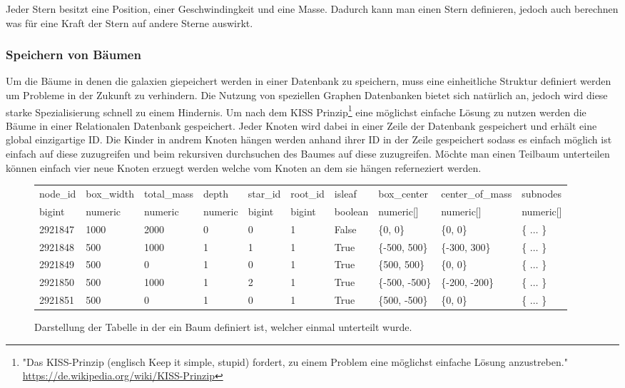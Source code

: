 \par Jeder Stern besitzt eine Position, einer Geschwindingkeit und eine Masse.
Dadurch kann man einen Stern definieren, jedoch auch berechnen was für eine
Kraft der Stern auf andere Sterne auswirkt. 

\subsubsection{Speichern von Bäumen}
Um die Bäume in denen die galaxien giepeichert werden in einer Datenbank zu
speichern, muss eine einheitliche Struktur definiert werden um Probleme in der
Zukunft zu verhindern. Die Nutzung von speziellen Graphen Datenbanken bietet
sich natürlich an, jedoch wird diese starke Spezialisierung schnell zu einem
Hindernis. Um nach dem KISS Prinzip\footnote{"Das KISS-Prinzip (englisch Keep
it simple, stupid) fordert, zu einem Problem eine möglichst einfache Lösung
anzustreben." \url{https://de.wikipedia.org/wiki/KISS-Prinzip}} eine möglichst
einfache Lösung zu nutzen werden die Bäume in einer Relationalen Datenbank
gespeichert. Jeder Knoten wird dabei in einer Zeile der Datenbank gespeichert
und erhält eine global einzigartige ID. Die Kinder in andrem Knoten hängen
werden anhand ihrer ID in der Zeile gespeichert sodass es einfach möglich ist
einfach auf diese zuzugreifen und beim rekursiven durchsuchen des Baumes auf
diese zuzugreifen. Möchte man einen Teilbaum unterteilen können einfach vier
neue Knoten erzuegt werden welche vom Knoten an dem sie hängen referneziert
werden.

\begin{figure*}[ht]
\begin{tabular} {l | l | l | l | l | l | l | l | l | l}
node\_id & box\_width & total\_mass & depth & star\_id & root\_id & isleaf & box\_center & center\_of\_mass & subnodes  \\ 
bigint & numeric & numeric & numeric & bigint & bigint & boolean & numeric[] & numeric[] & numeric[]  \\ \hline\hline
2921847 & 1000 & 2000 & 0 & 0 & 1 & False & \{0, 0\}       & \{0, 0\}       & \{ \(\dots\) \}  \\ \hline
2921848 & 500  & 1000 & 1 & 1 & 1 & True  & \{-500, 500\}  & \{-300, 300\}  & \{ \(\dots\) \}  \\ \hline
2921849 & 500  & 0    & 1 & 0 & 1 & True  & \{500, 500\}   & \{0, 0\}       & \{ \(\dots\) \}  \\ \hline
2921850 & 500  & 1000 & 1 & 2 & 1 & True  & \{-500, -500\} & \{-200, -200\} & \{ \(\dots\) \}  \\ \hline
2921851 & 500  & 0    & 1 & 0 & 1 & True  & \{500, -500\}  & \{0, 0\}       & \{ \(\dots\) \}  \\ \hline
\end{tabular}
\caption{Darstellung der Tabelle in der ein Baum definiert ist, welcher einmal unterteilt wurde.}
\end{figure*}


